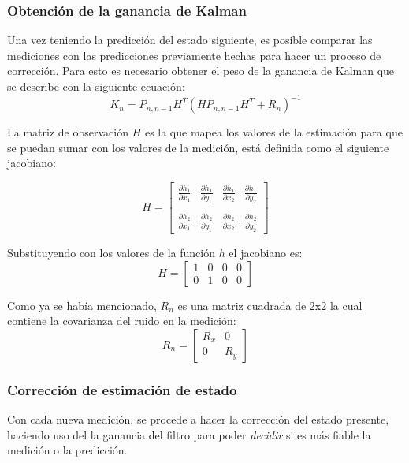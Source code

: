 		\subsubsection*{Obtención de la ganancia de Kalman}
	Una vez teniendo la predicción del estado siguiente, es posible comparar las mediciones con las predicciones previamente hechas para hacer un proceso de corrección. Para esto es necesario obtener el peso de la ganancia de Kalman que se describe con la siguiente ecuación:
\begin{equation}
	K_n = P_{n,n-1} H^T (H P_{n,n-1} H^T + R_n)^{-1}
	\label{eq:kalman_gain}
\end{equation}

	La matriz de observación $H$ es la que mapea los valores de la estimación para que se puedan sumar con los valores de la medición, está definida como el siguiente jacobiano:

\begin{equation}
	H =
	\begin{bmatrix}
	\frac{\partial h_1}{\partial x_1} & \frac{\partial h_1}{\partial y_1} & \frac{\partial h_1}{\partial x_2} & \frac{\partial h_1}{\partial y_2}\\
	\\
	\frac{\partial h_2}{\partial x_1} & \frac{\partial h_2}{\partial y_1} & \frac{\partial h_2}{\partial x_2} & \frac{\partial h_2}{\partial y_2}
	\end{bmatrix}
\end{equation}

Substituyendo con los valores de la función $h$ el jacobiano es:
\begin{equation}
	H =
	\begin{bmatrix}
	1 & 0 & 0 & 0\\
	0 & 1 & 0 & 0
	\end{bmatrix}
\end{equation}

Como ya se había mencionado, $R_n$ es una matriz cuadrada de 2x2 la cual contiene la covarianza del ruido en la medición:
\begin{equation}
	R_n = 
	\begin{bmatrix}
	R_x & 0\\
	0  & R_y
	\end{bmatrix}
\end{equation} 

		\subsubsection*{Corrección de estimación de estado}
	Con cada nueva medición, se procede a hacer la corrección del estado presente, haciendo uso del la ganancia del filtro para poder \textit{decidir} si es más fiable la medición o la predicción.

